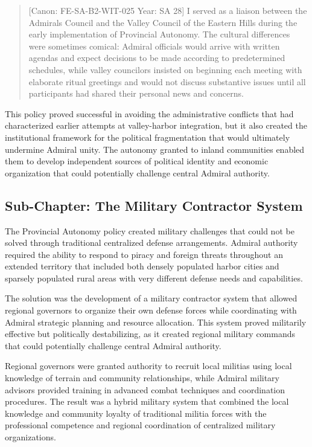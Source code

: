 \begin{quote}
{[}Canon: FE-SA-B2-WIT-025 \textbar{} Year: SA 28{]} I served as a
liaison between the Admiral\textquotesingle s Council and the Valley
Council of the Eastern Hills during the early implementation of
Provincial Autonomy. The cultural differences were sometimes comical:
Admiral officials would arrive with written agendas and expect decisions
to be made according to predetermined schedules, while valley councilors
insisted on beginning each meeting with elaborate ritual greetings and
would not discuss substantive issues until all participants had shared
their personal news and concerns.
\end{quote}

This policy proved successful in avoiding the administrative conflicts
that had characterized earlier attempts at valley-harbor integration,
but it also created the institutional framework for the political
fragmentation that would ultimately undermine Admiral unity. The
autonomy granted to inland communities enabled them to develop
independent sources of political identity and economic organization that
could potentially challenge central Admiral authority.

\subsection{Sub-Chapter: The Military Contractor
System}\label{sub-chapter-the-military-contractor-system}

The Provincial Autonomy policy created military challenges that could
not be solved through traditional centralized defense arrangements.
Admiral authority required the ability to respond to piracy and foreign
threats throughout an extended territory that included both densely
populated harbor cities and sparsely populated rural areas with very
different defense needs and capabilities.

The solution was the development of a military contractor system that
allowed regional governors to organize their own defense forces while
coordinating with Admiral strategic planning and resource allocation.
This system proved militarily effective but politically destabilizing,
as it created regional military commands that could potentially
challenge central Admiral authority.

Regional governors were granted authority to recruit local militias
using local knowledge of terrain and community relationships, while
Admiral military advisors provided training in advanced combat
techniques and coordination procedures. The result was a hybrid military
system that combined the local knowledge and community loyalty of
traditional militia forces with the professional competence and regional
coordination of centralized military organizations.

